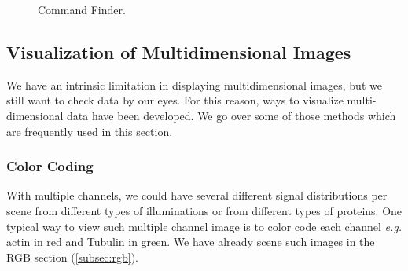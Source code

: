 \begin{figure}[htbp]
\centering
{}
\quad
{} 
\caption{Command Finder.}
\label{fig:commandfinder}
\end{figure}


\subsection{Visualization of Multidimensional Images}

We have an intrinsic limitation in displaying multidimensional images, but we still want to check data by our eyes. For this reason, ways to visualize multi-dimensional data have been developed. We go over some of those methods which are frequently used in this section. 

\subsubsection{Color Coding}

With multiple channels, we could have several different signal distributions per scene from different types of illuminations or from different types of proteins. One typical way to view such multiple channel image is to color code each channel \textit{e.g.} actin in red and Tubulin in green. We have already scene such images in the RGB section (\ref{subsec:rgb}). 

